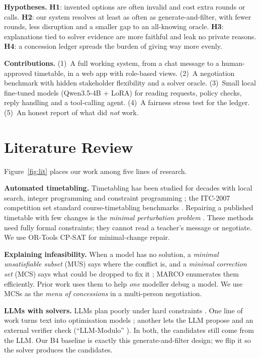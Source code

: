 \documentclass[10pt,a4paper]{article}
\begin{document}
\textbf{Hypotheses.} \textbf{H1}: invented options are often invalid and cost
extra rounds or calls. \textbf{H2}: our system resolves at least as often as
generate-and-filter, with fewer rounds, less disruption and a smaller gap to
an all-knowing oracle. \textbf{H3}: explanations tied to solver evidence are
more faithful and leak no private reasons. \textbf{H4}: a concession ledger
spreads the burden of giving way more evenly.

\textbf{Contributions.} (1)~A full working system, from a chat message to a
human-approved timetable, in a web app with role-based views. (2)~A
negotiation benchmark with hidden stakeholder flexibility and a solver
oracle. (3)~Small local fine-tuned models (Qwen3.5-4B + LoRA) for reading
requests, policy checks, reply handling and a tool-calling agent. (4)~A
fairness stress test for the ledger. (5)~An honest report of what did
\emph{not} work.

\section{Literature Review}
Figure~\ref{fig:lit} places our work among five lines of research.

\textbf{Automated timetabling.} Timetabling has been studied for decades with
local search, integer programming and constraint programming \citep{schaerf1999survey};
the ITC-2007 competition set standard course-timetabling benchmarks \citep{mccollum2010itc}.
Repairing a published timetable with few changes is the \emph{minimal perturbation
problem} \citep{muller2005mpp}. These methods need fully formal constraints; they
cannot read a teacher's message or negotiate. We use OR-Tools CP-SAT \citep{ortools}
for minimal-change repair.

\textbf{Explaining infeasibility.} When a model has no solution, a
\emph{minimal unsatisfiable subset} (MUS) says where the conflict is, and a
\emph{minimal correction set} (MCS) says what could be dropped to fix it
\citep{liffiton2008mus}; MARCO \citep{liffiton2016marco} enumerates them efficiently.
Prior work uses them to help \emph{one} modeller debug a model. We use MCSs as the
\emph{menu of concessions} in a multi-person negotiation.

\textbf{LLMs with solvers.} LLMs plan poorly under hard constraints
\citep{kambhampati2024llmmodulo}. One line of work turns text into optimisation
models \citep{ahmaditeshnizi2024optimus}; another lets the LLM propose and an
external verifier check (``LLM-Modulo'' \citep{kambhampati2024llmmodulo}). In both,
the candidates still come from the LLM. Our B4 baseline is exactly this
generate-and-filter design; we flip it so the solver produces the candidates.
\end{document}
